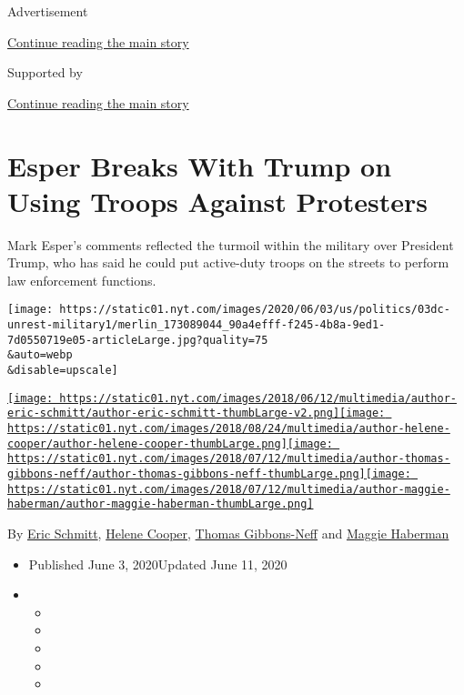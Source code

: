 Advertisement

\protect\hyperlink{after-top}{Continue reading the main story}

Supported by

\protect\hyperlink{after-sponsor}{Continue reading the main story}

\hypertarget{esper-breaks-with-trump-on-using-troops-against-protesters}{%
\section{Esper Breaks With Trump on Using Troops Against
Protesters}\label{esper-breaks-with-trump-on-using-troops-against-protesters}}

Mark Esper's comments reflected the turmoil within the military over
President Trump, who has said he could put active-duty troops on the
streets to perform law enforcement functions.

\texttt{[image: https://static01.nyt.com/images/2020/06/03/us/politics/03dc-unrest-military1/merlin\_173089044\_90a4efff-f245-4b8a-9ed1-7d0550719e05-articleLarge.jpg?quality=75\\\&auto=webp\\\&disable=upscale]}

\href{https://www.nytimes.com/by/eric-schmitt}{\texttt{[image: https://static01.nyt.com/images/2018/06/12/multimedia/author-eric-schmitt/author-eric-schmitt-thumbLarge-v2.png]}}\href{https://www.nytimes.com/by/helene-cooper}{\texttt{[image: https://static01.nyt.com/images/2018/08/24/multimedia/author-helene-cooper/author-helene-cooper-thumbLarge.png]}}\href{https://www.nytimes.com/by/thomas-gibbons-neff}{\texttt{[image: https://static01.nyt.com/images/2018/07/12/multimedia/author-thomas-gibbons-neff/author-thomas-gibbons-neff-thumbLarge.png]}}\href{https://www.nytimes.com/by/maggie-haberman}{\texttt{[image: https://static01.nyt.com/images/2018/07/12/multimedia/author-maggie-haberman/author-maggie-haberman-thumbLarge.png]}}

By \href{https://www.nytimes.com/by/eric-schmitt}{Eric Schmitt},
\href{https://www.nytimes.com/by/helene-cooper}{Helene Cooper},
\href{https://www.nytimes.com/by/thomas-gibbons-neff}{Thomas
Gibbons-Neff} and
\href{https://www.nytimes.com/by/maggie-haberman}{Maggie Haberman}

\begin{itemize}
\item
  Published June 3, 2020Updated June 11, 2020
\item
  \begin{itemize}
  \item
  \item
  \item
  \item
  \item
  \end{itemize}
\end{itemize}

